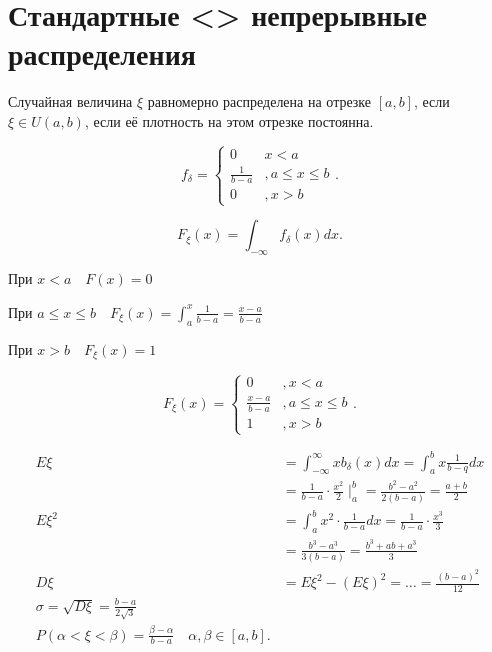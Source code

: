 \section{Стандартные <> непрерывные распределения}

\begin{definition}
    Случайная величина $\xi$ равномерно распределена на отрезке $[a,b]$, если $\xi\in U(a,b)$, если её плотность на этом отрезке постоянна.

    \[
    f_\delta = \begin{cases}
        0&x<a\\ \frac{1}{b-a}&, a\leqslant x\leqslant b\\ 0&,x>b
    \end{cases}
    .\] 
\end{definition}

\begin{note}
   \[
       F_\xi(x) = \int_{-\infty } f_\delta(x)dx
   .\]

   При $x<a\quad F(x) = 0$

   При  $a\leqslant x\leqslant b\quad F_\xi(x) = \int_a^x \frac{1}{b-a} = \frac{x-a}{b-a}$ 

   При $x>b\quad F_\xi(x) = 1$

    \[
        F_\xi(x) = \begin{cases}
            0&,x<a\\ \frac{x-a}{b-a}&, a \leqslant x\leqslant b\\ 1&, x>b
        \end{cases}
   .\] 

   \begin{align*}
       E\xi &= \int_{-\infty }^{\infty}xb_{\delta}(x)dx = \int_a^b x \frac{1}{b-q}dx\\
            &=  \frac{1}{b-a}\cdot \frac{x^2}{2} \mid_a^b = \frac{b^2-a^2}{2(b-a)} = \frac{a+b}{2}\\

         E\xi^2 &= \int_a^b x^2 \cdot \frac{1}{b-a}dx = \frac{1}{b-a}\cdot \frac{x^3}{3} \\
                &= \frac{b^3 - a^3}{3(b-a)} = \frac{b^3+ab+a^3}{3} \\
         D\xi &= E\xi^2 - \left( E\xi \right) ^2 = \ldots = \frac{(b-a)^2}{12}\\
         \sigma = \sqrt{D\xi} = \frac{b-a}{2\sqrt{3} }\\
         P\left( \alpha <\xi<\beta \right)  = \frac{\beta - \alpha}{b-a}\quad \alpha, \beta\in[a,b]
   .\end{align*}
\end{note}

